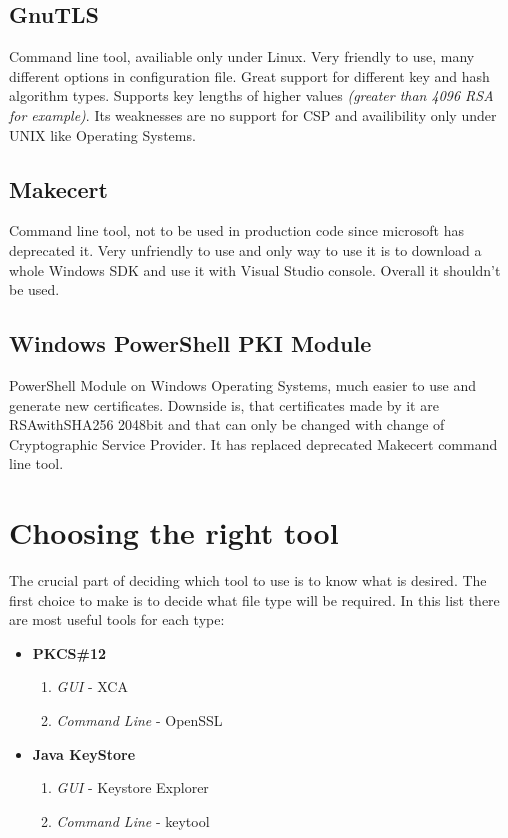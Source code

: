 \documentclass[10pt, a4paper]{report}
\begin{document}
\section{GnuTLS}
Command line tool, availiable only under Linux. Very friendly to use, many different options in configuration file. Great support for different key and hash algorithm types. Supports key lengths of higher values \textit{(greater than 4096 RSA for example)}. Its weaknesses are no support for CSP and availibility only under UNIX like Operating Systems.

\section{Makecert}
Command line tool, not to be used in production code since microsoft has deprecated it. Very unfriendly to use and only way to use it is to download a whole Windows SDK and use it with Visual Studio console. Overall it shouldn't be used.


\section{Windows PowerShell PKI Module}
PowerShell Module on Windows Operating Systems, much easier to use and generate new certificates. Downside is, that certificates made by it are RSAwithSHA256 2048bit and that can only be changed with change of Cryptographic Service Provider. It has replaced deprecated Makecert command line tool.

\chapter{Choosing the right tool}
The crucial part of deciding which tool to use is to know what is desired. The first choice to make is to decide what file type will be required.
In this list there are most useful tools for each type:

\begin{itemize}
 \item \textbf{PKCS\#12} \begin{enumerate}\item \textit{GUI} - XCA \item \textit{Command Line} - OpenSSL \end{enumerate}
 \item \textbf{Java KeyStore} \begin{enumerate}\item \textit{GUI} - Keystore Explorer \item \textit{Command Line} - keytool \end{enumerate}
\end{itemize}
\end{document}
